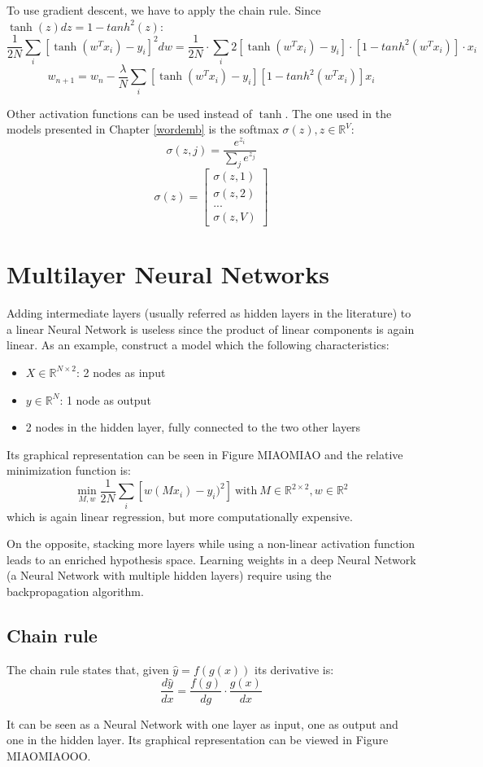 To use gradient descent, we have to apply the chain rule.
Since $\tanh(z) dz = 1 - tanh^2(z)$:
$$ \frac{1}{2N} \sum_i [\tanh(w^T x_i) - y_i]^2 dw =
    \frac{1}{2N} \cdot \sum_i 2[\tanh(w^T x_i) - y_i] \cdot [1 - tanh^2(w^T x_i)] \cdot x_i $$
$$ w_{n+1} = w_n -
    \frac{\lambda}{N} \sum_i [\tanh(w^T x_i) - y_i] [1 - tanh^2(w^T x_i)] x_i $$

Other activation functions can be used instead of $\tanh$.
The one used in the models presented in Chapter \ref{wordemb} is the softmax
$\sigma(z), z \in \mathbb{R}^V$:
$$\sigma(z, j) =  \frac{e^{z_i}}{\sum_j e^{z_j}}$$
$$ \sigma(z) =
    \begin{bmatrix}
        \sigma(z, 1) \\ \sigma(z, 2) \\ ... \\ \sigma(z, V)
    \end{bmatrix}
$$

\section{Multilayer Neural Networks}
Adding intermediate layers (usually referred as hidden layers in the literature)
to a linear Neural Network is useless
since the product of linear components is again linear.
As an example, construct a model which the following characteristics:
\begin{itemize}
    \item $X \in \mathbb{R}^{N \times 2}$: 2 nodes as input
    \item $y \in \mathbb{R}^N$: 1 node as output
    \item 2 nodes in the hidden layer, fully connected to the two other layers
\end{itemize}
Its graphical representation can be seen in Figure MIAOMIAO
and the relative minimization function is:
$$ \displaystyle \min_{M, w} \frac{1}{2N} \sum_i [ w(M x_i) - y_i)^2 ]
    \ \text{with} \
    M \in \mathbb{R}^{2 \times 2}, w \in \mathbb{R}^{2}$$
which is again linear regression, but more computationally expensive.

On the opposite, stacking more layers while using a non-linear activation function
leads to an enriched hypothesis space. Learning weights in a deep Neural Network
(a Neural Network with multiple hidden layers) require using the backpropagation algorithm.

\subsection{Chain rule}
The chain rule states that, given $\hat{y} = f(g(x))$ its derivative is:
$$ \frac{d\hat{y}}{dx} = \frac{f(g)}{dg} \cdot \frac{g(x)}{dx} $$

It can be seen as a Neural Network with one layer as input, one as output and one in the hidden layer.
Its graphical representation can be viewed in Figure MIAOMIAOOO.